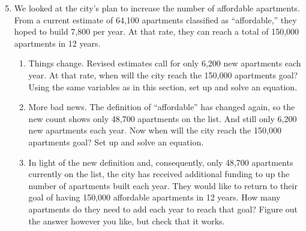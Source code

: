 \begin{enumerate} 
\setcounter{enumi}{4}

\item We looked at the city's plan to increase the number of affordable apartments.  From a current estimate of  64,100  apartments classified as ``affordable,'' they hoped to build 7,800 per year.  At that rate, they can reach a total of 150,000 apartments in 12 years.
\begin{enumerate}
\item Things change.  Revised estimates call for only 6,200 new apartments each year.  At that rate, when will the city reach the 150,000 apartments goal?  Using the same variables as in this section, set up and solve an equation.
\item More bad news.  The definition of ``affordable'' has changed again, so the new count shows only 48,700 apartments on the list.  And still only 6,200 new apartments each year.  Now when will the city reach the 150,000 apartments goal?  Set up and solve an equation.
\item In light of the new definition and, consequently, only 48,700 apartments currently on the list, the city has received additional funding to up the number of apartments built each year.  They would like to return to their goal of having 150,000 affordable apartments in 12 years.  How many apartments do they need to add each year to reach that goal?  Figure out the answer however you like, but check that it works.
\end{enumerate}


\end{enumerate}
